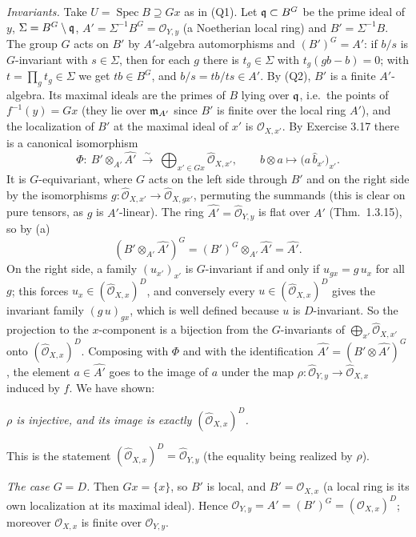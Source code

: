 \documentclass[11pt]{article}
\begin{document}
\emph{Invariants.} Take $U=\operatorname{Spec}B\supseteq Gx$ as in (Q1). Let $\mathfrak q\subset B^G$ be the prime ideal of $y$, $\Sigma=B^G\setminus\mathfrak q$, $A'=\Sigma^{-1}B^G=\mathcal O_{Y,y}$ (a Noetherian local ring) and $B'=\Sigma^{-1}B$. The group $G$ acts on $B'$ by $A'$-algebra automorphisms and $(B')^G=A'$: if $b/s$ is $G$-invariant with $s\in\Sigma$, then for each $g$ there is $t_g\in\Sigma$ with $t_g(gb-b)=0$; with $t=\prod_gt_g\in\Sigma$ we get $tb\in B^G$, and $b/s=tb/ts\in A'$. By (Q2), $B'$ is a finite $A'$-algebra. Its maximal ideals are the primes of $B$ lying over $\mathfrak q$, i.e.\ the points of $f^{-1}(y)=Gx$ (they lie over $\mathfrak m_{A'}$ since $B'$ is finite over the local ring $A'$), and the localization of $B'$ at the maximal ideal of $x'$ is $\mathcal O_{X,x'}$. By Exercise 3.17 there is a canonical isomorphism
\[ \Phi:\ B'\otimes_{A'}\widehat{A'}\ \xrightarrow{\ \sim\ }\ \bigoplus_{x'\in Gx}\widehat{\mathcal O}_{X,x'},\qquad b\otimes a\mapsto\bigl(a\,\hat b_{x'}\bigr)_{x'}. \]
It is $G$-equivariant, where $G$ acts on the left side through $B'$ and on the right side by the isomorphisms $g:\widehat{\mathcal O}_{X,x'}\to\widehat{\mathcal O}_{X,gx'}$, permuting the summands (this is clear on pure tensors, as $g$ is $A'$-linear). The ring $\widehat{A'}=\widehat{\mathcal O}_{Y,y}$ is flat over $A'$ (Thm.~1.3.15), so by (a)
\[ (B'\otimes_{A'}\widehat{A'})^G=(B')^G\otimes_{A'}\widehat{A'}=\widehat{A'}. \]
On the right side, a family $(u_{x'})_{x'}$ is $G$-invariant if and only if $u_{gx}=g\,u_x$ for all $g$; this forces $u_x\in(\widehat{\mathcal O}_{X,x})^D$, and conversely every $u\in(\widehat{\mathcal O}_{X,x})^D$ gives the invariant family $(g\,u)_{gx}$, which is well defined because $u$ is $D$-invariant. So the projection to the $x$-component is a bijection from the $G$-invariants of $\bigoplus_{x'}\widehat{\mathcal O}_{X,x'}$ onto $(\widehat{\mathcal O}_{X,x})^D$. Composing with $\Phi$ and with the identification $\widehat{A'}=(B'\otimes\widehat{A'})^G$, the element $a\in\widehat{A'}$ goes to the image of $a$ under the map $\rho:\widehat{\mathcal O}_{Y,y}\to\widehat{\mathcal O}_{X,x}$ induced by $f$. We have shown:
\par\emph{$\rho$ is injective, and its image is exactly $(\widehat{\mathcal O}_{X,x})^D$.}\par
This is the statement $(\widehat{\mathcal O}_{X,x})^D=\widehat{\mathcal O}_{Y,y}$ (the equality being realized by $\rho$).

\emph{The case $G=D$.} Then $Gx=\{x\}$, so $B'$ is local, and $B'=\mathcal O_{X,x}$ (a local ring is its own localization at its maximal ideal). Hence $\mathcal O_{Y,y}=A'=(B')^G=(\mathcal O_{X,x})^D$; moreover $\mathcal O_{X,x}$ is finite over $\mathcal O_{Y,y}$.
\end{document}
